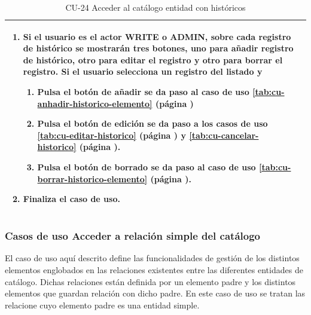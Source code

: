 \begin{table} [H]
{\begin{tabular}{| m{3cm} | m{11cm} |}
\begin{enumerate}
		\item Si el usuario es el actor WRITE o ADMIN, sobre cada registro de histórico se mostrarán tres botones, uno para añadir registro de histórico, otro para editar el registro y otro para borrar el registro. Si el usuario selecciona un registro del listado y
		    \begin{enumerate}
		         \item Pulsa el botón de añadir se da paso al caso de uso \ref{tab:cu-anhadir-historico-elemento} (página \pageref{tab:cu-anhadir-historico-elemento})
		        \item Pulsa el botón de edición se da paso a los casos de uso \ref{tab:cu-editar-historico} (página \pageref{tab:cu-editar-historico}) y \ref{tab:cu-cancelar-historico} (página \pageref{tab:cu-cancelar-historico}).
		        \item Pulsa el botón de borrado se da paso al caso de uso \ref{tab:cu-borrar-historico-elemento} (página \pageref{tab:cu-borrar-historico-elemento}).
		    \end{enumerate} 
		\item Finaliza el caso de uso.
	  \end{enumerate} 	  	  
	  \\\hline
    \end{tabular}
    } %
    \caption{CU-24 Acceder al catálogo entidad con históricos}
    \label{tab:cu-listar-catálogo-historico}
\end{table}



\subsubsection{Casos de uso Acceder a relación simple del catálogo} 
\label{sub:cu-relacion-catalogo-simple}

El caso de uso aquí descrito define las funcionalidades de gestión de los distintos elementos englobados en las relaciones existentes entre las diferentes entidades de catálogo. Dichas relaciones están definida por un elemento padre y los distintos elementos que guardan relación con dicho padre. En este caso de uso se tratan las relacione cuyo elemento padre es una entidad simple.



